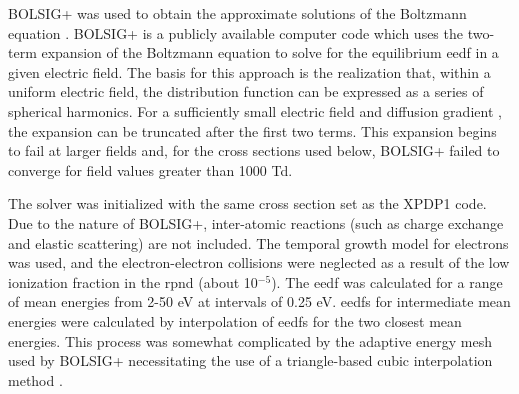 BOLSIG+ was used to obtain the approximate solutions of the Boltzmann equation
\cite{Hagelaar2005}. BOLSIG+ is a publicly available computer code which uses
the two-term expansion of the Boltzmann equation to solve for the equilibrium
\acs{eedf} in a given electric field. The basis for this approach is the
realization that, within a uniform electric field, the distribution function can
be expressed as a series of spherical harmonics. For a sufficiently small
electric field and diffusion gradient \cite{Holstein1946}, the expansion can be
truncated after the first two terms. This expansion begins to fail at larger
fields \cite{Allis1982} and, for the cross sections used below, BOLSIG+ failed
to converge for field values greater than 1000 Td.

The solver was initialized with the same cross section set as the XPDP1 code.
Due to the nature of BOLSIG+, inter-atomic reactions (such as charge exchange
and elastic scattering) are not included. The temporal growth model for
electrons was used, and the electron-electron collisions were neglected as a
result of the low ionization fraction in the \acs{rpnd} (about 10$^{-5}$). The
\acs{eedf} was calculated for a range of mean energies from 2-50 eV at intervals
of 0.25 eV. \acs{eedf}s for intermediate mean energies were calculated by
interpolation of \acs{eedf}s for the two closest mean energies. This process was
somewhat complicated by the adaptive energy mesh used by BOLSIG+ necessitating
the use of a triangle-based cubic interpolation method \cite{Jones2001}.

